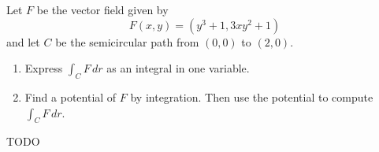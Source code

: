 \begin{exercise}
	Let $F$ be the vector field given by
	$$
		F(x,y) = (y^3 + 1, 3xy^2 + 1)
	$$
	and let $C$ be the semicircular path from $(0,0)$ to $(2,0)$.
	\begin{enumerate}
		\item Express $\int_C F \, dr$ as an integral in one variable.

		\item Find a potential of $F$ by integration. Then use the potential to compute $\int_C F \, dr$.
	\end{enumerate}
\end{exercise}

\begin{solution}
	TODO
\end{solution}
